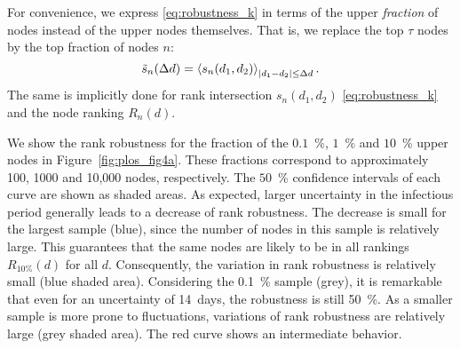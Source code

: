 For convenience, we express \eqref{eq:robustness_k} in terms of the upper \emph{fraction} of nodes instead of the upper nodes themselves.
That is, we replace the top $\tau $ nodes by the top fraction of nodes $n$:
\begin{equation}\label{eq:rank_robustness}
\tilde{s}_n (\Delta d)=\left< s_n (d_1,d_2) \right>_{\left| d_1-d_2 \right|\leq \Delta d} .
\end{equation}
The same is implicitly done for rank intersection $s_n(d_1,d_2)$ \eqref{eq:robustness_k} and the node ranking $R_n(d)$.

We show the rank robustness for the fraction of the $0.1$~\%, $1$~\% and $10$~\% upper nodes in Figure~\ref{fig:plos_fig4a}.
These fractions correspond to approximately 100, 1000 and 10,000 nodes, respectively.
The $50$~\% confidence intervals of each curve are shown as shaded areas.
As expected, larger uncertainty in the infectious period generally leads to a decrease of rank robustness.
The decrease is small for the largest sample (blue), since the number of nodes in this sample is relatively large.
This guarantees that the same nodes are likely to be in all rankings $R_{10\%}(d)$ for all $d$.  
Consequently, the variation in rank robustness is relatively small (blue shaded area).
Considering the 0.1~\% sample (grey), it is remarkable that even for an uncertainty of 14~days, the robustness is still 50~\%.
As a smaller sample is more prone to fluctuations, variations of rank robustness are relatively large (grey shaded area).
The red curve shows an intermediate behavior.

